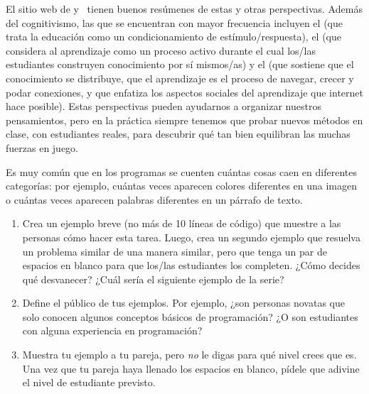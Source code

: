 El sitio web de 
y~\cite{Wibu2016}
tienen buenos resúmenes de estas y otras perspectivas.
Además del cognitivismo, las que se encuentran con mayor frecuencia incluyen el 
(que trata la educación como un condicionamiento de estímulo/respuesta),
el 
(que considera al aprendizaje como un proceso activo durante el cual los/las estudiantes construyen conocimiento por sí mismos/as)
y el 
(que sostiene que el conocimiento se distribuye,
que el aprendizaje es el proceso de navegar, crecer y podar conexiones,
y que enfatiza los aspectos sociales del aprendizaje que internet hace posible).
Estas perspectivas pueden ayudarnos a organizar nuestros pensamientos,
pero en la práctica
siempre tenemos que probar nuevos métodos en clase,
con estudiantes reales,
para descubrir qué tan bien equilibran las muchas fuerzas en juego.



Es muy común que en los programas se cuenten cuántas cosas caen en diferentes categorías:
por ejemplo,
cuántas veces aparecen colores diferentes en una imagen
o cuántas veces aparecen palabras diferentes en un párrafo de texto.

\begin{enumerate}
\item
    Crea un ejemplo breve (no más de 10 líneas de código) que muestre a las personas cómo hacer esta tarea.
    Luego, crea un segundo ejemplo que resuelva un problema similar de una manera similar,
    pero que tenga un par de espacios en blanco para que los/las estudiantes los completen.
    ¿Cómo decides qué desvanecer?
    ¿Cuál sería el siguiente ejemplo de la serie?

\item
    Define el público de tus ejemplos.
    Por ejemplo,
    ¿son personas novatas que solo conocen algunos conceptos básicos de programación?
    ¿O son estudiantes con alguna experiencia en programación?

\item
    Muestra tu ejemplo a tu pareja,
    pero \emph{no} le digas para qué nivel crees que es.
    Una vez que tu pareja haya llenado los espacios en blanco,
    pídele que adivine el nivel de estudiante previsto.

\end{enumerate}

